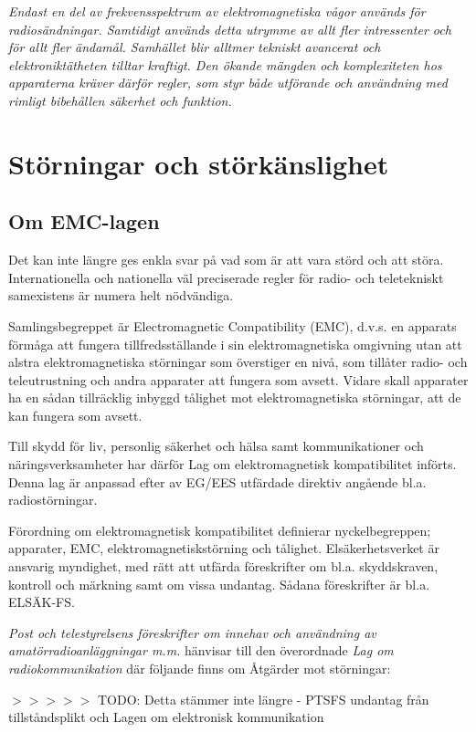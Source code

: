 \emph{Endast en del av frekvensspektrum av elektromagnetiska vågor
  används för radiosändningar. Samtidigt används detta utrymme av allt
  fler intressenter och för allt fler ändamål.  Samhället blir alltmer
  tekniskt avancerat och elektroniktätheten tilltar kraftigt. Den
  ökande mängden och komplexiteten hos apparaterna kräver därför
  regler, som styr både utförande och användning med rimligt
  bibehållen säkerhet och funktion.}

\section{Störningar och störkänslighet}

\subsection{Om EMC-lagen}

Det kan inte längre ges enkla svar på vad som är att vara störd och
att störa. Internationella och nationella väl preciserade regler för
radio- och teletekniskt samexistens är numera helt nödvändiga.

Samlingsbegreppet är Electromagnetic Compatibility (EMC), d.v.s. en
apparats förmåga att fungera tillfredsställande i sin
elektromagnetiska omgivning utan att alstra elektromagnetiska
störningar som överstiger en nivå, som tillåter radio- och
teleutrustning och andra apparater att fungera som avsett.  Vidare
skall apparater ha en sådan tillräcklig inbyggd tålighet mot
elektromagnetiska störningar, att de kan fungera som avsett.

Till skydd för liv, personlig säkerhet och hälsa samt kommunikationer
och näringsverksamheter har därför Lag om elektromagnetisk
kompatibilitet införts. Denna lag är anpassad efter av EG/EES
utfärdade direktiv angående bl.a. radiostörningar.

Förordning om elektromagnetisk kompatibilitet definierar
nyckelbegreppen; apparater, EMC, elektromagnetiskstörning och
tålighet. Elsäkerhetsverket är ansvarig myndighet, med rätt att
utfärda föreskrifter om bl.a. skyddskraven, kontroll och märkning samt
om vissa undantag. Sådana föreskrifter är bl.a. ELSÄK-FS.

\emph{Post och telestyrelsens föreskrifter om innehav och användning
  av amatörradioanläggningar m.m.} hänvisar till den överordnade
\emph{Lag om radiokommunikation} där följande finns om Åtgärder mot
störningar:

$>>>>>$ TODO: Detta stämmer inte längre - PTSFS undantag från tillståndsplikt
och Lagen om elektronisk kommunikation

